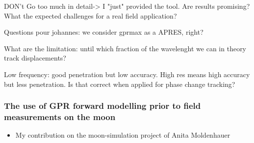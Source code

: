 \begin{itemize}
    DON't Go too much in detail-> I "just" provided the tool.
    Are results promising? What the expected challenges for a real field application?
\end{itemize}








Questions pour johannes: we consider gprmax as a APRES, right?

What are the limitation: until which fraction of the wavelenght we can in theory track displacements?

Low frequency: good penetration but low accuracy. High res means high accuracy but less penetration. Is that correct when applied for phase change tracking?


\subsubsection{The use of GPR forward modelling prior to field measurements on the moon}

\begin{itemize}
    \item My contribution on the moon-simulation project of Anita Moldenhauer
\end{itemize}




